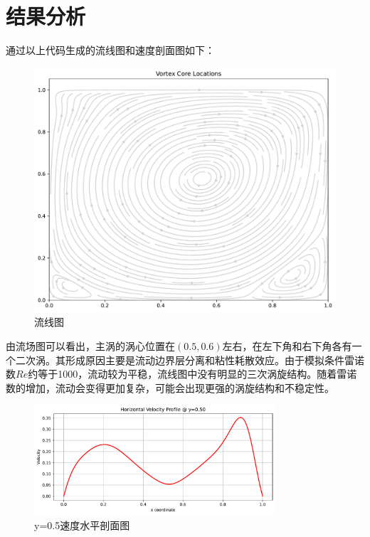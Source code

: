 \documentclass[12pt,a4paper]{article}
\begin{document}
\section{结果分析}
通过以上代码生成的流线图和速度剖面图如下：
\begin{figure}[H]
    \centering
    \includegraphics[width=1\textwidth]{1_streamlines.pdf}
    \caption{流线图}
    \label{fig:streamline}
\end{figure}
由流场图可以看出，主涡的涡心位置在$(0.5, 0.6)$左右，在左下角和右下角各有一个二次涡。其形成原因主要是流动边界层分离和粘性耗散效应。由于模拟条件雷诺数$Re$约等于1000，流动较为平稳，流线图中没有明显的三次涡旋结构。随着雷诺数的增加，流动会变得更加复杂，可能会出现更强的涡旋结构和不稳定性。
\begin{figure}[H]
    \centering
    \includegraphics[width=0.8\textwidth]{2_horizontal_profile.pdf}
    \caption{y=0.5速度水平剖面图}
    \label{fig:velocity_profile}
\end{figure}
\end{document}
